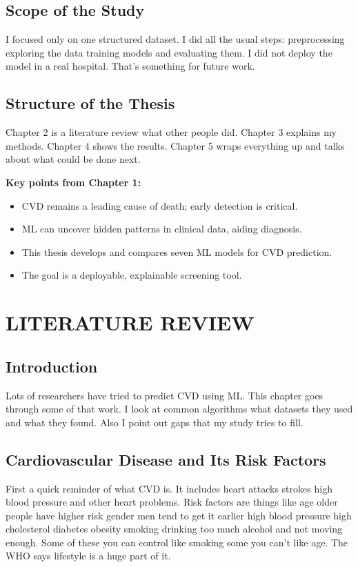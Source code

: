 \documentclass[11pt, a4paper, oneside]{book}
\begin{document}
\section{Scope of the Study}
I focused only on one structured dataset. I did all the usual steps: preprocessing exploring the data training models and evaluating them. I did not deploy the model in a real hospital. That's something for future work.

\section{Structure of the Thesis}
Chapter 2 is a literature review what other people did. Chapter 3 explains my methods. Chapter 4 shows the results. Chapter 5 wraps everything up and talks about what could be done next.

\begin{takeaway}
\textbf{Key points from Chapter 1:}
\begin{itemize}
  \item CVD remains a leading cause of death; early detection is critical.
  \item ML can uncover hidden patterns in clinical data, aiding diagnosis.
  \item This thesis develops and compares seven ML models for CVD prediction.
  \item The goal is a deployable, explainable screening tool.
\end{itemize}
\end{takeaway}

\chapter{LITERATURE REVIEW}

\section{Introduction}
Lots of researchers have tried to predict CVD using ML. This chapter goes through some of that work. I look at common algorithms what datasets they used and what they found. Also I point out gaps that my study tries to fill.

\section{Cardiovascular Disease and Its Risk Factors}
First a quick reminder of what CVD is. It includes heart attacks strokes high blood pressure and other heart problems. Risk factors are things like age older people have higher risk gender men tend to get it earlier high blood pressure high cholesterol diabetes obesity smoking drinking too much alcohol and not moving enough. Some of these you can control like smoking some you can't like age. The WHO says lifestyle is a huge part of it.
\end{document}
